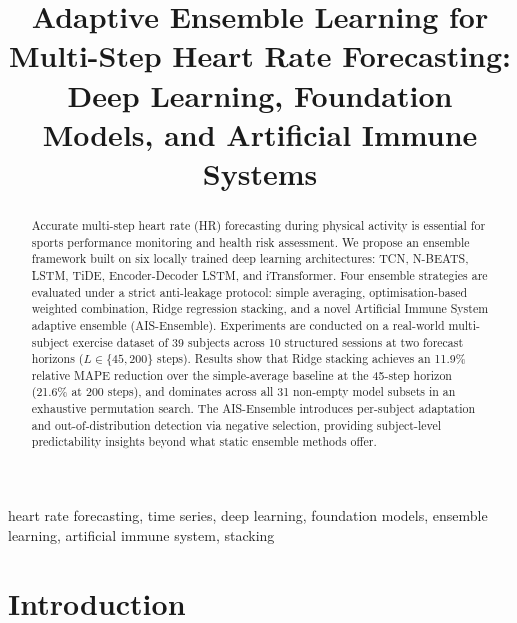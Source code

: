\documentclass[conference]{IEEEtran}
\begin{document}
\title{Adaptive Ensemble Learning for Multi-Step Heart Rate Forecasting:
       Deep Learning, Foundation Models, and Artificial Immune Systems}

\author{%
}

\maketitle

\begin{abstract}
Accurate multi-step heart rate (HR) forecasting during physical activity is
essential for sports performance monitoring and health risk assessment.  We
propose an ensemble framework built on six locally trained deep learning
architectures: TCN, N-BEATS, LSTM, TiDE, Encoder-Decoder LSTM, and
iTransformer.  Four ensemble strategies are evaluated under a strict
anti-leakage protocol: simple averaging, optimisation-based weighted
combination, Ridge regression stacking, and a novel Artificial Immune System
adaptive ensemble (AIS-Ensemble).  Experiments are conducted on a real-world
multi-subject exercise dataset of 39 subjects across 10 structured sessions at
two forecast horizons ($L \in \{45, 200\}$ steps).  Results show that Ridge
stacking achieves an 11.9\% relative MAPE reduction over the simple-average
baseline at the 45-step horizon (21.6\% at 200 steps), and dominates across
all 31 non-empty model subsets in an exhaustive permutation search.  The
AIS-Ensemble introduces per-subject adaptation and out-of-distribution detection
via negative selection, providing subject-level predictability insights beyond
what static ensemble methods offer.
\end{abstract}

\begin{IEEEkeywords}
heart rate forecasting, time series, deep learning, foundation models, ensemble
learning, artificial immune system, stacking
\end{IEEEkeywords}

\section{Introduction}
\label{sec:intro}
\end{document}
